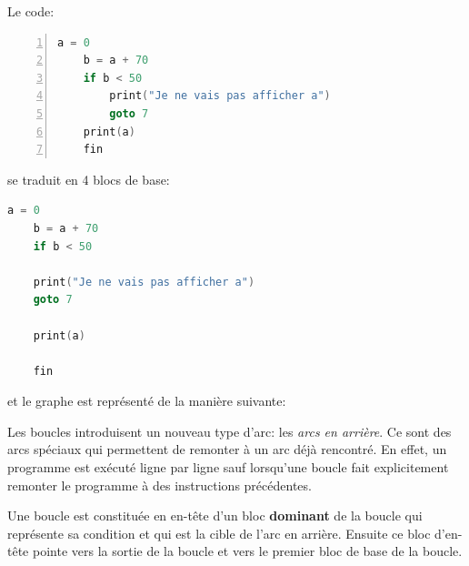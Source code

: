 Le code:
\begin{lstlisting}[language=c, numbers=left, xleftmargin=.35\textwidth, caption={Exemple de code à transformer}, captionpos=b]
    a = 0
    b = a + 70
    if b < 50
        print("Je ne vais pas afficher a")
        goto 7
    print(a)
    fin
\end{lstlisting}
se traduit en 4 blocs de base:
\newpage
\begin{lstlisting}[language=c, xleftmargin=.26\textwidth, caption={Séparation du code précédent en blocs de base}, captionpos=b]
    a = 0
    b = a + 70
    if b < 50

    print("Je ne vais pas afficher a")
    goto 7

    print(a)

    fin
\end{lstlisting}
et le graphe est représenté de la manière suivante:
\begin{center}
\end{center}

Les boucles introduisent un nouveau type d'arc: les \textit{arcs en arrière}. Ce sont des arcs spéciaux qui permettent de remonter à un arc déjà rencontré. En effet, un programme est exécuté ligne par ligne sauf lorsqu'une boucle fait explicitement remonter le programme à des instructions précédentes. 

Une boucle est constituée en en-tête d'un bloc \textbf{dominant} de la boucle qui représente sa condition et qui est la cible de l'arc en arrière. Ensuite ce bloc d'en-tête pointe vers la sortie de la boucle et vers le premier bloc de base de la boucle.

